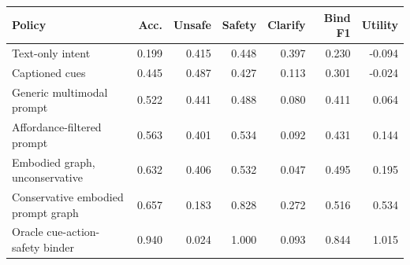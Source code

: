 \begin{tabular}{lrrrrrr}
\toprule
Policy & Acc. & Unsafe & Safety & Clarify & Bind F1 & Utility \\
\midrule
Text-only intent & 0.199 & 0.415 & 0.448 & 0.397 & 0.230 & -0.094 \\
Captioned cues & 0.445 & 0.487 & 0.427 & 0.113 & 0.301 & -0.024 \\
Generic multimodal prompt & 0.522 & 0.441 & 0.488 & 0.080 & 0.411 & 0.064 \\
Affordance-filtered prompt & 0.563 & 0.401 & 0.534 & 0.092 & 0.431 & 0.144 \\
Embodied graph, unconservative & 0.632 & 0.406 & 0.532 & 0.047 & 0.495 & 0.195 \\
Conservative embodied prompt graph & 0.657 & 0.183 & 0.828 & 0.272 & 0.516 & 0.534 \\
Oracle cue-action-safety binder & 0.940 & 0.024 & 1.000 & 0.093 & 0.844 & 1.015 \\
\bottomrule
\end{tabular}
